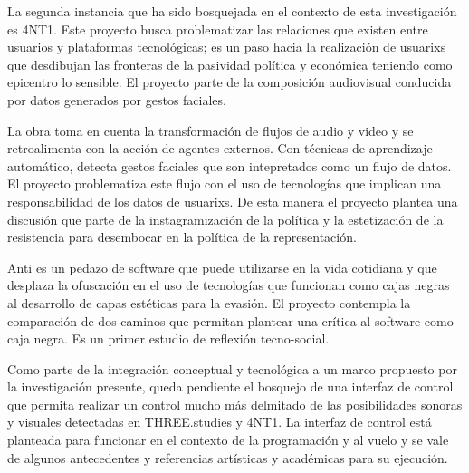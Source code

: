 La segunda instancia que ha sido bosquejada en el contexto de esta investigación es 4NT1. Este proyecto busca problematizar las relaciones que existen entre usuarios y plataformas tecnológicas; es un paso hacia la realización de usuarixs que desdibujan las fronteras de la pasividad política y económica teniendo como epicentro lo sensible. El proyecto parte de la composición audiovisual conducida por datos generados por gestos faciales. 

La obra toma en cuenta la transformación de flujos de audio y video y se retroalimenta con la acción de agentes externos. Con técnicas de aprendizaje automático, detecta gestos faciales que son intepretados como un flujo de datos. El proyecto problematiza este flujo con el uso de tecnologías que implican una responsabilidad de los datos de usuarixs. De esta manera el proyecto plantea una discusión que parte de la instagramización de la política y la estetización de la resistencia para desembocar en la política de la representación.

Anti es un pedazo de software que puede utilizarse en la vida cotidiana y que desplaza la ofuscación en el uso de tecnologías que funcionan como cajas negras al desarrollo de capas estéticas para la evasión. El proyecto contempla la comparación de dos caminos que permitan plantear una crítica al software como caja negra. Es un primer estudio de reflexión tecno-social.

Como parte de la integración conceptual y tecnológica a un marco propuesto por la investigación presente, queda pendiente el bosquejo de una interfaz de control que permita realizar un control mucho más delmitado de las posibilidades sonoras y visuales detectadas en THREE.studies y 4NT1. La interfaz de control está planteada para funcionar en el contexto de la programación y al vuelo y se vale de algunos antecedentes y referencias artísticas y académicas para su ejecución. 




